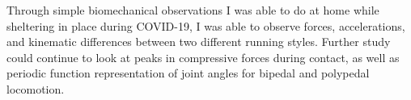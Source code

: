 Through simple biomechanical observations I was able to do at home while sheltering in place during COVID-19, I was able to observe forces, accelerations, and kinematic differences between two different running styles. Further study could continue to look at peaks in compressive forces during contact, as well as periodic function representation of joint angles for bipedal and polypedal locomotion. 